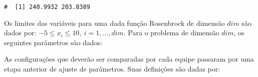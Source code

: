\documentclass[11pt,twoside,printwatermark=false]{pinp}
\begin{document}
\begin{ShadedResult}
\begin{verbatim}
#  [1] 240.9932 203.8389
\end{verbatim}
\end{ShadedResult}

Os limites das variáveis para uma dada função Rosenbrock de dimensão
\(dim\) são dados por: \(-5\leq x_i\leq 10,~i=1,\dotsc,dim\). Para o
problema de dimensão \(dim\), os seguintes parâmetros são dados:

\begin{Shaded}
\begin{Highlighting}[]
\StringTok{ }

\StringTok{ }\NormalTok{(} \NormalTok{)}
\StringTok{ }\NormalTok{(} \NormalTok{, }  \OperatorTok{*}\StringTok{ }  \OperatorTok{*}\StringTok{ }
\StringTok{ }\NormalTok{(} \NormalTok{, } \NormalTok{(}\OperatorTok{-} \NormalTok{(}
\StringTok{ } \OperatorTok{*}\StringTok{ }
\end{Highlighting}
\end{Shaded}

As configurações que deverão ser comparadas por cada equipe passaram por
uma etapa anterior de ajuste de parâmetros. Suas definições são dadas
por:

\begin{Shaded}
\begin{Highlighting}[]

\StringTok{ }\NormalTok{(} \NormalTok{) }
\StringTok{ }\NormalTok{(} \NormalTok{, } \NormalTok{)}

\StringTok{ }\NormalTok{(} \NormalTok{, } \NormalTok{) }
\StringTok{ }\NormalTok{(} \NormalTok{, } \NormalTok{)}
\end{Highlighting}
\end{Shaded}
\end{document}
